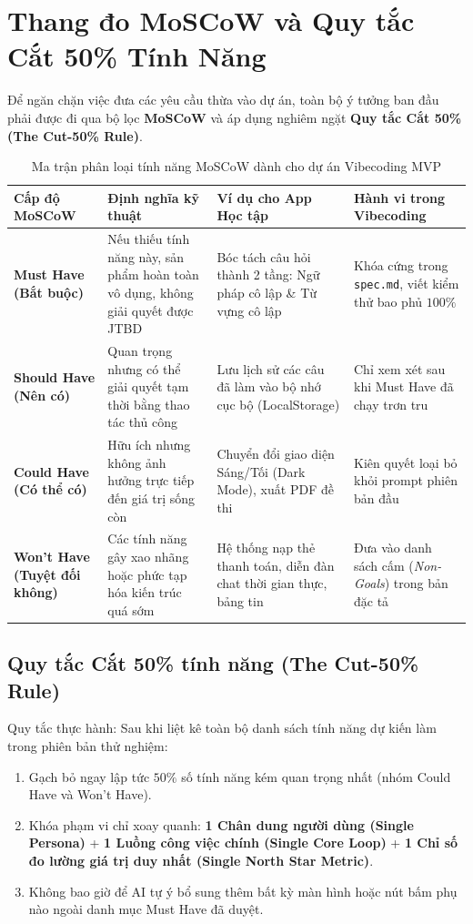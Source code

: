 \documentclass[a4paper,11pt]{article}
\begin{document}
\section{Thang đo MoSCoW và Quy tắc Cắt 50\% Tính Năng}

Để ngăn chặn việc đưa các yêu cầu thừa vào dự án, toàn bộ ý tưởng ban đầu phải được đi qua bộ lọc \textbf{MoSCoW} và áp dụng nghiêm ngặt \textbf{Quy tắc Cắt 50\% (The Cut-50\% Rule)}.

\begin{table}[htbp]
\centering
\small
\caption{Ma trận phân loại tính năng MoSCoW dành cho dự án Vibecoding MVP}
\vspace{0.5em}
\begin{tabularx}{\textwidth}{L{2.5cm} L{4.5cm} L{4cm} Y}
\toprule
\textbf{Cấp độ MoSCoW} & \textbf{Định nghĩa kỹ thuật} & \textbf{Ví dụ cho App Học tập} & \textbf{Hành vi trong Vibecoding} \\
\midrule
\textbf{Must Have (Bắt buộc)} & Nếu thiếu tính năng này, sản phẩm hoàn toàn vô dụng, không giải quyết được JTBD & Bóc tách câu hỏi thành 2 tầng: Ngữ pháp cô lập \& Từ vựng cô lập & Khóa cứng trong \texttt{spec.md}, viết kiểm thử bao phủ $100\%$ \\
\textbf{Should Have (Nên có)} & Quan trọng nhưng có thể giải quyết tạm thời bằng thao tác thủ công & Lưu lịch sử các câu đã làm vào bộ nhớ cục bộ (LocalStorage) & Chỉ xem xét sau khi Must Have đã chạy trơn tru \\
\textbf{Could Have (Có thể có)} & Hữu ích nhưng không ảnh hưởng trực tiếp đến giá trị sống còn & Chuyển đổi giao diện Sáng/Tối (Dark Mode), xuất PDF đề thi & Kiên quyết loại bỏ khỏi prompt phiên bản đầu \\
\textbf{Won't Have (Tuyệt đối không)} & Các tính năng gây xao nhãng hoặc phức tạp hóa kiến trúc quá sớm & Hệ thống nạp thẻ thanh toán, diễn đàn chat thời gian thực, bảng tin & Đưa vào danh sách cấm (\textit{Non-Goals}) trong bản đặc tả \\
\bottomrule
\end{tabularx}
\end{table}

\subsection{Quy tắc Cắt 50\% tính năng (The Cut-50\% Rule)}
Quy tắc thực hành: Sau khi liệt kê toàn bộ danh sách tính năng dự kiến làm trong phiên bản thử nghiệm:
\begin{enumerate}[label={\arabic*.}]
    \item Gạch bỏ ngay lập tức $50\%$ số tính năng kém quan trọng nhất (nhóm Could Have và Won't Have).
    \item Khóa phạm vi chỉ xoay quanh: \textbf{1 Chân dung người dùng (Single Persona)} + \textbf{1 Luồng công việc chính (Single Core Loop)} + \textbf{1 Chỉ số đo lường giá trị duy nhất (Single North Star Metric)}.
    \item Không bao giờ để AI tự ý bổ sung thêm bất kỳ màn hình hoặc nút bấm phụ nào ngoài danh mục Must Have đã duyệt.
\end{enumerate}
\end{document}
